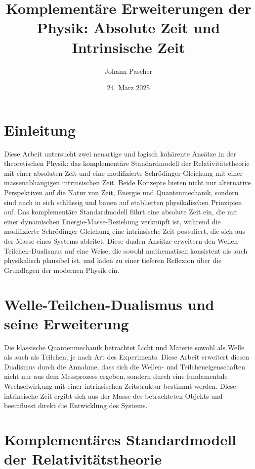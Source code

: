 \documentclass[a4paper,12pt]{article}
\begin{document}
	
	\title{Komplementäre Erweiterungen der Physik: Absolute Zeit und Intrinsische Zeit}
	\author{Johann Pascher} %
	\date{24. März 2025}
	\maketitle
	
	\tableofcontents %
	\newpage %
	
	\section{Einleitung}
	Diese Arbeit untersucht zwei neuartige und logisch kohärente Ansätze in der theoretischen Physik: das komplementäre Standardmodell der Relativitätstheorie mit einer absoluten Zeit und eine modifizierte Schrödinger-Gleichung mit einer massenabhängigen intrinsischen Zeit. Beide Konzepte bieten nicht nur alternative Perspektiven auf die Natur von Zeit, Energie und Quantenmechanik, sondern sind auch in sich schlüssig und bauen auf etablierten physikalischen Prinzipien auf. Das komplementäre Standardmodell führt eine absolute Zeit ein, die mit einer dynamischen Energie-Masse-Beziehung verknüpft ist, während die modifizierte Schrödinger-Gleichung eine intrinsische Zeit postuliert, die sich aus der Masse eines Systems ableitet. Diese dualen Ansätze erweitern den Wellen-Teilchen-Dualismus auf eine Weise, die sowohl mathematisch konsistent als auch physikalisch plausibel ist, und laden zu einer tieferen Reflexion über die Grundlagen der modernen Physik ein.
	
	\section{Welle-Teilchen-Dualismus und seine Erweiterung}
	Die klassische Quantenmechanik betrachtet Licht und Materie sowohl als Welle als auch als Teilchen, je nach Art des Experiments. Diese Arbeit erweitert diesen Dualismus durch die Annahme, dass sich die Wellen- und Teilcheneigenschaften nicht nur aus dem Messprozess ergeben, sondern durch eine fundamentale Wechselwirkung mit einer intrinsischen Zeitstruktur bestimmt werden. Diese intrinsische Zeit ergibt sich aus der Masse des betrachteten Objekts und beeinflusst direkt die Entwicklung des Systems.
	
	\section{Komplementäres Standardmodell der Relativitätstheorie}
	
\end{document}
